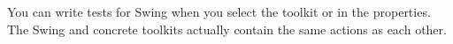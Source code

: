 You can write tests for Swing \gdauts{} when you select the toolkit  or  in the \gdproject{} properties. The Swing and concrete toolkits actually contain the same actions as each other. 
